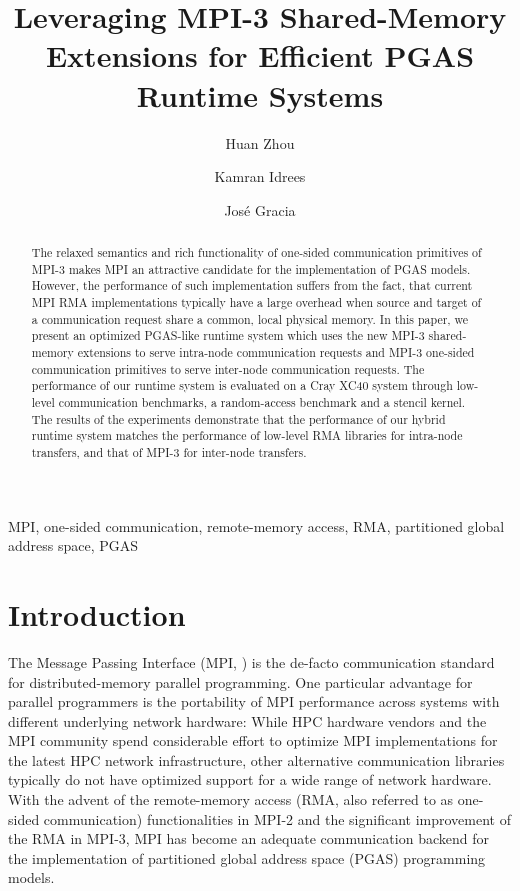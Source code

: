 \documentclass{llncs}
\newcommand{\todo}[1]{}
\newcommand{\MPI}[1]{\mbox{MPI-#1}\xspace}
\begin{document}
\title{Leveraging MPI-3 Shared-Memory Extensions for Efficient PGAS
  Runtime Systems}

\author{
  Huan Zhou
  \and Kamran Idrees
  \and Jos\'e Gracia
}


\maketitle

\begin{abstract}
  The relaxed semantics and rich functionality of one-sided
  communication
primitives of \MPI3 makes MPI an attractive candidate for
  the implementation of PGAS
  models. However, the performance of such implementation suffers
  from the fact, that current MPI RMA implementations 
typically have a large overhead when source and target of a
  communication request share a common, local physical memory.  In
  this paper, we present an optimized PGAS-like runtime system
  which uses the new \MPI3 shared-memory extensions to
  serve intra-node communication requests and \MPI3 one-sided
  communication primitives to serve inter-node communication requests.
The performance of our runtime system is evaluated on a Cray XC40
system through low-level communication benchmarks, a random-access
benchmark and a stencil kernel.  The results of the experiments
demonstrate that the performance of our hybrid runtime system matches
the performance of low-level RMA libraries for intra-node transfers,
and that of \MPI3 for inter-node transfers.
\end{abstract}
\begin{keywords}
 MPI, one-sided communication, remote-memory access, RMA, partitioned
 global address space, PGAS
\end{keywords}


\section{Introduction}
\todo{Why only blocking: direct memcopy is a
blocking operation, only. Therefore need progress engine or similar
for non-blocking hybrid.}
The Message Passing Interface (MPI, \cite{mpi3}) is the de-facto
communication standard for distributed-memory parallel programming.
One particular advantage for parallel programmers is the portability
of MPI performance across systems with different underlying network
hardware: While HPC hardware vendors and the MPI community spend
considerable effort to optimize MPI implementations for the latest HPC
network infrastructure, other alternative communication libraries
typically do not have optimized support for a wide range of network
hardware.
With the advent of the remote-memory access (RMA, also referred to as
one-sided communication) functionalities in \MPI2\cite{mpi22} and the
significant improvement of the RMA in \MPI3\cite{mpi3}, MPI has become an
adequate communication backend for the implementation of partitioned
global address space (PGAS) programming models\cite{pgas}.
\end{document}

